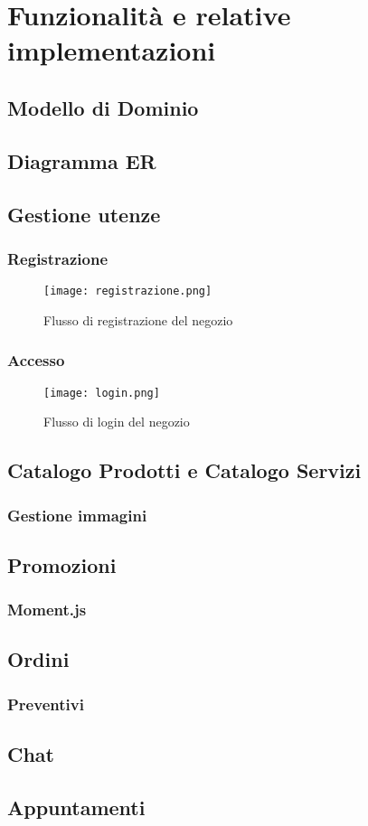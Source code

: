 \chapter{Funzionalità e relative implementazioni}
\section{Modello di Dominio}
\section{Diagramma ER}
\section{Gestione utenze}
\subsection{Registrazione}
\begin{figure}[!htb]
    \centering
    \texttt{[image: registrazione.png]}
    \caption{Flusso di registrazione del negozio}
\end{figure}
\subsection{Accesso}
\begin{figure}[!htb]
    \centering
    \texttt{[image: login.png]}
    \caption{Flusso di login del negozio}
\end{figure}
\section{Catalogo Prodotti e Catalogo Servizi}
\subsection{Gestione immagini}
\section{Promozioni}
\subsection{Moment.js}
\section{Ordini}
\subsection{Preventivi}
\section{Chat}
\section{Appuntamenti}